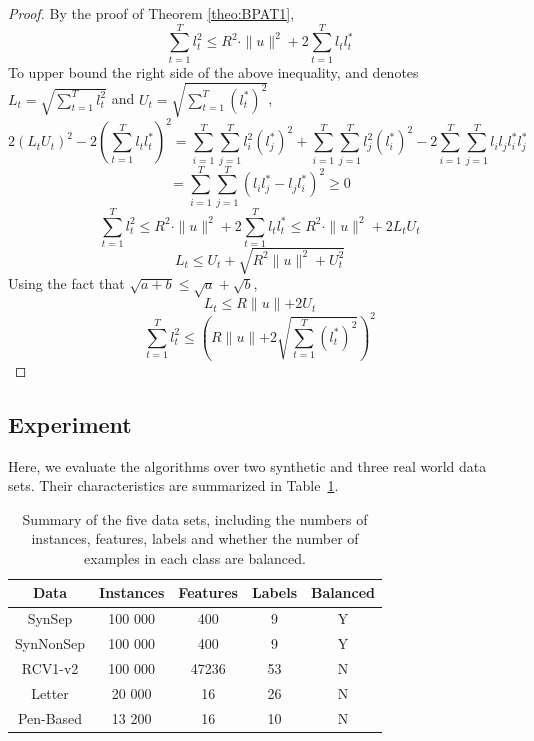 \begin{proof}
By the proof of Theorem \ref{theo:BPAT1}, 
\[\sum_{t=1}^{T}l_t^2 \leqslant R^2\cdot \parallel{u}\parallel^2 + 2\sum_{t=1}^{T}l_t l_t^{\ast}\]
To upper bound the right side of the above inequality, and denotes $L_t = \sqrt{\sum_{t=1}^{T}l_t^2}$ and $U_t = \sqrt{\sum_{t=1}^{T}(l_t^{\ast})^2}$, 
\[2(L_tU_t)^2-2(\sum_{t=1}^{T}l_tl_t^{\ast})^2 = \sum_{i=1}^{T}\sum_{j=1}^{T}l_i^2(l_j^{\ast})^2+\sum_{i=1}^{T}\sum_{j=1}^{T}l_j^2(l_i^{\ast})^2 - 2\sum_{i=1}^{T}\sum_{j=1}^{T}l_il_jl_i^{\ast}l_j^{\ast}\]
\[ = \sum_{i=1}^{T}\sum_{j=1}^{T}(l_il_j^{\ast}-l_jl_i^{\ast})^2 \geqslant 0\]
\[\sum_{t=1}^{T}l_t^2 \leqslant R^2 \cdot \parallel{u}\parallel^2+2\sum_{t=1}^{T}l_tl_t^{\ast}\leqslant R^2 \cdot \parallel{u}\parallel^2+2L_tU_t\]
\[L_t \leqslant U_t+\sqrt{R^2\parallel{u}\parallel^2+U_t^2}\]
Using the fact that $\sqrt{a+b}\leqslant \sqrt{a}+\sqrt{b}$,
\[L_t \leqslant R\parallel{u}\parallel+2 U_t\]
\[\sum_{t=1}^{T}l_t^2 \leqslant \left(R\parallel{u}\parallel+2 \sqrt{\sum_{t=1}^{T}(l_t^{\ast})^2}\right)^2 \]
\end{proof}

\subsection{Experiment}
\label{subsec:BPAE}
Here, we evaluate the algorithms over two synthetic and three real world data sets. Their characteristics are summarized in Table~\ref{table:mce}.

\begin{table}[b]
\caption{Summary of the five data sets, including the numbers of instances, features, labels and whether the number of examples in each class are balanced.}
\label{table:mce}
\begin{center}
\begin{tabular}{|c|c|c|c|c|}
\hline 
Data           & Instances 	&Features 	&  Labels 	& Balanced\\ 
\hline 
SynSep         &100 000 	& 400   	& 9  		& Y \\
\hline 
SynNonSep      &100 000 	& 400   	& 9  		& Y \\
\hline 
RCV1-v2        &100 000 	& 47236 	& 53 		& N \\
\hline 
Letter         &20 000  	& 16    	& 26 		& N \\
\hline 
Pen-Based &13 200  	& 16    	& 10 		& N \\
\hline 
\end{tabular}
\end{center}
\end{table}

